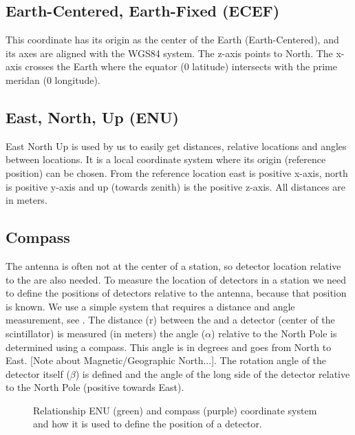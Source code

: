 \subsection{Earth-Centered, Earth-Fixed (ECEF)}

This coordinate has its origin as the center of the Earth
(Earth-Centered), and its axes are aligned with the WGS84 system. The
z-axis points to North. The x-axis crosses the Earth where the equator
(\SI{0}{\degrees} latitude) intersects with the prime meridan
(\SI{0}{\degrees} longitude).


\subsection{East, North, Up (ENU)}

East North Up is used by us to easily get distances, relative locations
and angles between locations. It is a local coordinate system where its
origin (reference position) can be chosen. From the reference location
east is positive x-axis, north is positive y-axis and up (towards
zenith) is the positive z-axis. All distances are in meters.


\subsection{Compass}

The \gps antenna is often not at the center of a station, so detector
location relative to the \gps are also needed. To measure the location
of detectors in a station we need to define the positions of detectors
relative to the \gps antenna, because that position is known. We use a
simple system that requires a distance and angle measurement, see
. The distance (r) between the \gps and a
detector (center of the scintillator) is measured (in meters) the angle
($\alpha$) relative to the North Pole is determined using a compass.
This angle is in degrees and goes from North to East. [Note about
Magnetic/Geographic North...]. The rotation angle of the detector itself
($\beta$) is defined and the angle of the long side of the detector
relative to the North Pole (positive towards East).

\begin{figure}
    \centering
    
    \caption{Relationship ENU (green) and compass (purple) coordinate system
             and how it is used to define the position of a detector.}
    \label{fig:enu_compass}
\end{figure}


